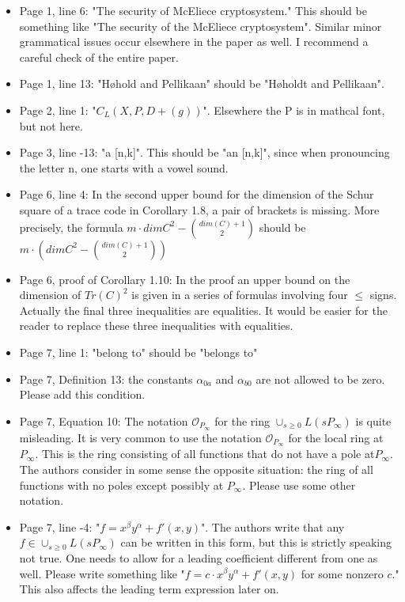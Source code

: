 \documentclass[12pt,a4paper]{amsart}
\begin{document}
\begin{itemize}
\item Page 1, line 6: "The security of McEliece cryptosystem." This should be something like "The security of the McEliece cryptosystem". Similar minor grammatical issues occur elsewhere in the paper as well. I recommend a careful check of the entire paper.

\item Page 1, line 13: "H\o hold and Pellikaan" should be "H\o holdt and Pellikaan".

\item Page 2, line 1: "$C_L(X,P,D+(g))$". Elsewhere the P is in mathcal font, but not here.

\item Page 3, line -13: "a [n,k]". This should be "an [n,k]", since when pronouncing the letter n, one starts with a vowel sound.

\item Page 6, line 4: In the second upper bound for the dimension of the Schur square of a trace code in Corollary 1.8, a pair of brackets is missing. More precisely, the formula $m \cdot dim C^2-\binom{dim(C)+1}{2}$ should be $m \cdot \left( dim C^2-\binom{dim(C)+1}{2}\right)$

\item Page 6, proof of Corollary 1.10: In the proof an upper bound on the dimension of $Tr(C)^2$ is given in a series of formulas involving four $\le$ signs. Actually the final three inequalities are equalities. It would be easier for the reader to replace these three inequalities with equalities.

\item Page 7, line 1: "belong to" should be "belongs to"

\item Page 7, Definition 13: the constants $\alpha_{0a}$ and $\alpha_{b0}$ are not allowed to be zero. Please add this condition.

\item Page 7, Equation 10: The notation $\mathcal{O}_{P_\infty}$ for the ring $\cup_{s \ge 0} L(sP_\infty)$ is quite misleading. It is very common to use the notation $\mathcal{O}_{P_\infty}$ for the local ring at $P_\infty$. This is the ring consisting of all functions that do not have a pole at$ P_\infty$. The authors consider in some sense the opposite situation: the ring of all functions with no poles except possibly at $P_\infty$. Please use some other notation.

\item Page 7, line -4: "$f=x^\beta y^\alpha+f'(x,y)$". The authors write that any $f \in \cup_{s \ge 0} L(sP_\infty)$ can be written in this form, but this is strictly speaking not true. One needs to allow for a leading coefficient different from one as well. Please write something like "$f=c\cdot x^\beta y^\alpha+f'(x,y)$ for some nonzero $c$." This also affects the leading term expression later on.


\end{itemize}
\end{document}
